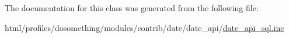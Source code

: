 The documentation for this class was generated from the following file:\begin{DoxyCompactItemize}
\item 
html/profiles/dosomething/modules/contrib/date/date\_\-api/\hyperlink{date__api__sql_8inc}{date\_\-api\_\-sql.inc}\end{DoxyCompactItemize}
